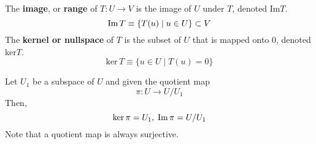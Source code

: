   \begin{definition}[Image]
    The \textbf{image}, or \textbf{range} of $T: U \longrightarrow V$ is the image of $U$ under $T$, denoted Im$T$. 
    \begin{equation}
      \im{T} \equiv \{ T(u) \; | \; u \in U\} \subset V
    \end{equation}
    The \textbf{kernel or nullspace} of $T$ is the subset of $U$ that is mapped onto $0$, denoted ker$T$. 
    \begin{equation}
      \text{ker}\,T \equiv \{ u \in U \; | \; T(u) = 0\}
    \end{equation}
  \end{definition}

  \begin{example}
    Let $U_1$ be a subspace of $U$ and given the quotient map
    \begin{equation}
      \pi: U \longrightarrow U / U_1
    \end{equation}
    Then, 
    \begin{equation}
      \text{ker}\,\pi = U_1, \; \im{\pi} = U / U_1
    \end{equation}
    Note that a quotient map is always surjective. 
  \end{example}

